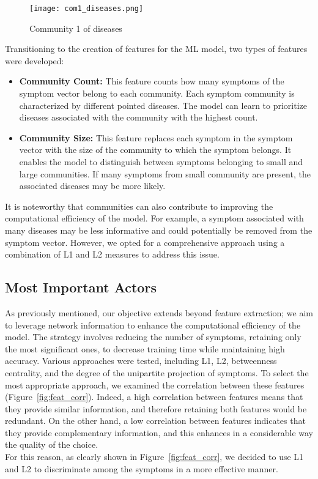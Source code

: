 \begin{figure}[H]
    \centering
    \texttt{[image: com1\_diseases.png]}
    \caption{Community 1 of diseases}
    \label{fig:com1_diseases}
\end{figure}
\noindent
Transitioning to the creation of features for the ML model, two types of features were developed:\\

\begin{itemize}
    \setlength\itemsep{1em} %

    \item \textbf{Community Count:} This feature counts how many symptoms of the symptom vector belong to each community.
          Each symptom community is characterized by different pointed diseases. The model can learn to prioritize
          diseases associated with the community with the highest count.

    \item \textbf{Community Size:} This feature replaces each symptom in the symptom vector with the size of the
          community to which the symptom belongs. It enables the model to distinguish between symptoms belonging to small and
          large communities. If many symptoms from small community are present, the associated diseases may be more likely.
\end{itemize}
\noindent
It is noteworthy that communities can also contribute to improving the computational efficiency of the model.
For example, a symptom associated with many diseases may be less informative and could potentially be removed from the
symptom vector. However, we opted for a comprehensive approach using a combination of L1 and L2 measures to address this issue.


\subsection{Most Important Actors}
\label{subsec:most_important_actors}

As previously mentioned, our objective extends beyond feature extraction; we aim to leverage network information to
enhance the computational efficiency of the model. The strategy involves reducing the number of symptoms,
retaining only the most significant ones, to decrease training time while maintaining high accuracy.
Various approaches were tested, including L1, L2, betweenness centrality, and the degree of the unipartite projection
of symptoms. To select the most appropriate approach, we examined the correlation between these features
(Figure~\ref{fig:feat_corr}). Indeed, a high correlation between features means that they provide
similar information, and therefore retaining both features would be redundant. On the other hand,
a low correlation between features indicates that they provide complementary information, and this enhances
in a considerable way the quality of the choice.\\
For this reason, as clearly shown in Figure~\ref{fig:feat_corr}, we decided to use L1 and L2 to discriminate
among the symptoms in a more effective manner.

